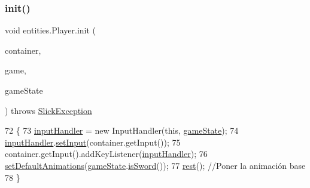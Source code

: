 \subsubsection{\texorpdfstring{init()}{init()}}
{\footnotesize\ttfamily void entities.\+Player.\+init (\begin{DoxyParamCaption}\item[{\mbox{\hyperlink{classorg_1_1newdawn_1_1slick_1_1_game_container}{Game\+Container}}}]{container,  }\item[{\mbox{\hyperlink{classorg_1_1newdawn_1_1slick_1_1state_1_1_state_based_game}{State\+Based\+Game}}}]{game,  }\item[{\mbox{\hyperlink{classstates_1_1_game_state}{Game\+State}}}]{game\+State }\end{DoxyParamCaption}) throws \mbox{\hyperlink{classorg_1_1newdawn_1_1slick_1_1_slick_exception}{Slick\+Exception}}\hspace{0.3cm}{\ttfamily [inline]}}


\begin{DoxyCode}
72                                                                                                            
         \{
73         \mbox{\hyperlink{classentities_1_1_player_a56ed11dfad1144c333bb21762ff6122e}{inputHandler}} = \textcolor{keyword}{new} InputHandler(\textcolor{keyword}{this}, \mbox{\hyperlink{classentities_1_1_player_a5c0c41f4ba8b9647580089c5314cd3a6}{gameState}});
74         \mbox{\hyperlink{classentities_1_1_player_a56ed11dfad1144c333bb21762ff6122e}{inputHandler}}.\mbox{\hyperlink{classentities_1_1_input_handler_ad3a1eb35970a169a68b3c01246562a3e}{setInput}}(container.getInput());
75         container.getInput().addKeyListener(\mbox{\hyperlink{classentities_1_1_player_a56ed11dfad1144c333bb21762ff6122e}{inputHandler}});
76         \mbox{\hyperlink{classentities_1_1_player_ad14066cb09a88306ecedb44f7f9f9e60}{setDefaultAnimations}}(\mbox{\hyperlink{classentities_1_1_player_a5c0c41f4ba8b9647580089c5314cd3a6}{gameState}}.\mbox{\hyperlink{classstates_1_1_game_state_add3708153f0df86c7909ae99846f2597}{isSword}}());
77         \mbox{\hyperlink{classentities_1_1_animated_sprite_entity_a968525f6ed17d7c57c1237dbc077b29d}{rest}}(); \textcolor{comment}{//Poner la animación base}
78     \}
\end{DoxyCode}
\mbox{\label{classentities_1_1_player_a72636c420f2cbca51ada895c6d948cdf}} 
